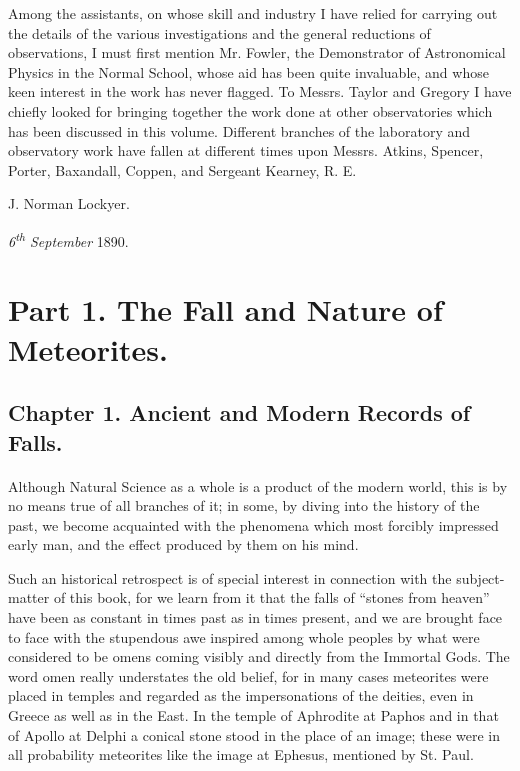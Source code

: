 \documentclass[a4paper, 12pt, oneside, polutonikogreek, english]{article}
\begin{document}
Among the assistants, on whose skill and industry I have relied for carrying out the details of the various investigations and the general reductions of observations, I must first mention Mr. Fowler, the Demonstrator of Astronomical Physics in the Normal School, whose aid has been quite invaluable, and whose keen interest in the work has never flagged. To Messrs. Taylor and Gregory I have chiefly looked for bringing together the work done at other observatories which has been discussed in this volume. Different branches of the laboratory and observatory work have fallen at different times upon Messrs. Atkins, Spencer, Porter, Baxandall, Coppen, and Sergeant Kearney, R. E.

J. Norman Lockyer.

\emph{6\textsuperscript{th} September} 1890.
\clearpage
\section{Part 1. The Fall and Nature of Meteorites.}
\subsection{Chapter 1. Ancient and Modern Records of Falls.}
\paragraph{}
Although Natural Science as a whole is a product of the modern world, this is by no means true of all branches of it; in some, by diving into the history of the past, we become acquainted with the phenomena which most forcibly impressed early man, and the effect produced by them on his mind.

Such an historical retrospect is of special interest in connection with the subject-matter of this book, for we learn from it that the falls of ``stones from heaven'' have been as constant in times past as in times present, and we are brought face to face with the stupendous awe inspired among whole peoples by what were considered to be omens coming visibly and directly from the Immortal Gods. The word omen really understates the old belief, for in many cases meteorites were placed in temples and regarded as the impersonations of the deities, even in Greece as well as in the East. In the temple of Aphrodite at Paphos and in that of Apollo at Delphi a conical stone stood in the place of an image; these were in all probability meteorites like the image at Ephesus, mentioned by St. Paul.
\end{document}
